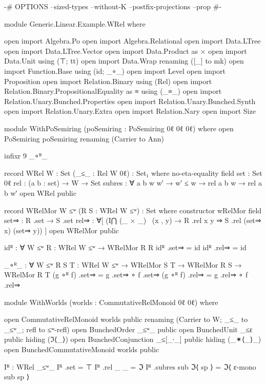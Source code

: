 \begin{code}
{-# OPTIONS --sized-types --without-K --postfix-projections --prop #-}

module Generic.Linear.Example.WRel where

  open import Algebra.Po
  open import Algebra.Relational
  open import Data.LTree
  open import Data.LTree.Vector
  open import Data.Product as ×
  open import Data.Unit using (⊤; tt)
  open import Data.Wrap renaming ([_] to mk)
  open import Function.Base using (id; _∘_)
  open import Level
  open import Proposition
  open import Relation.Binary using (Rel)
  open import Relation.Binary.PropositionalEquality as ≡ using (_≡_)
  open import Relation.Unary.Bunched.Properties
  open import Relation.Unary.Bunched.Synth
  open import Relation.Unary.Extra
  open import Relation.Nary
  open import Size

  module WithPoSemiring (poSemiring : PoSemiring 0ℓ 0ℓ 0ℓ) where
    open PoSemiring poSemiring renaming (Carrier to Ann)

    infixr 9 _∘ᴿ_

    record WRel {W : Set} (_≤_ : Rel W 0ℓ) : Set₁ where
      no-eta-equality
      field
        set : Set 0ℓ
        rel : (a b : set) → W → Set
        subres : ∀ {a b w w′} → w′ ≤ w → rel a b w → rel a b w′
    open WRel public

    record WRelMor {W ≤ʷ} (R S : WRel {W} ≤ʷ) : Set where
      constructor wRelMor
      field
        set⇒ : R .set → S .set
        rel⇒ :
          ∀[ (I⋂ (_ × _) \ (x , y) → R .rel x y ⇒ S .rel (set⇒ x) (set⇒ y)) ]
    open WRelMor public

    idᴿ : ∀ {W ≤ʷ} {R : WRel {W} ≤ʷ} → WRelMor R R
    idᴿ .set⇒ = id
    idᴿ .rel⇒ = id

    _∘ᴿ_ : ∀ {W ≤ʷ} {R S T : WRel {W} ≤ʷ} →
      WRelMor S T → WRelMor R S → WRelMor R T
    (g ∘ᴿ f) .set⇒ = g .set⇒ ∘ f .set⇒
    (g ∘ᴿ f) .rel⇒ = g .rel⇒ ∘ f .rel⇒

    module WithWorlds
      (worlds : CommutativeRelMonoid 0ℓ 0ℓ)
      where

      open CommutativeRelMonoid worlds public renaming
        (Carrier to W; _≤_ to _≤ʷ_; refl to ≤ʷ-refl)
      open BunchedOrder _≤ʷ_ public
      open BunchedUnit _≤ε public hiding (ℑ⟨_⟩)
      open BunchedConjunction _≤[_∙_] public hiding (_✴⟨_⟩_)
      open BunchedCommutativeMonoid worlds public

      Iᴿ : WRel _≤ʷ_
      Iᴿ .set = ⊤
      Iᴿ .rel _ _ = ℑ
      Iᴿ .subres sub ℑ⟨ sp ⟩ = ℑ⟨ ε-mono sub sp ⟩


\end{code}
